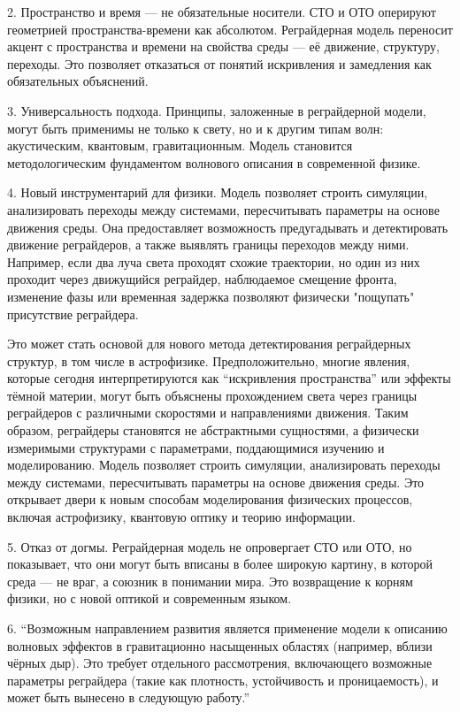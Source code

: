 \documentclass[12pt]{article}
\begin{document}
2. Пространство и время — не обязательные носители.
СТО и ОТО оперируют геометрией пространства-времени как абсолютом. Реграйдерная модель переносит акцент с пространства и времени на свойства среды — её движение, структуру, переходы. Это позволяет отказаться от понятий искривления и замедления как обязательных объяснений.

3. Универсальность подхода.
Принципы, заложенные в реграйдерной модели, могут быть применимы не только к свету, но и к другим типам волн: акустическим, квантовым, гравитационным. Модель становится методологическим фундаментом волнового описания в современной физике.

4. Новый инструментарий для физики.
Модель позволяет строить симуляции, анализировать переходы между системами, пересчитывать параметры на основе движения среды. Она предоставляет возможность предугадывать и детектировать движение реграйдеров, а также выявлять границы переходов между ними. Например, если два луча света проходят схожие траектории, но один из них проходит через движущийся реграйдер, наблюдаемое смещение фронта, изменение фазы или временная задержка позволяют физически "пощупать" присутствие реграйдера.

Это может стать основой для нового метода детектирования реграйдерных структур, в том числе в астрофизике. Предположительно, многие явления, которые сегодня интерпретируются как “искривления пространства” или эффекты тёмной материи, могут быть объяснены прохождением света через границы реграйдеров с различными скоростями и направлениями движения. Таким образом, реграйдеры становятся не абстрактными сущностями, а физически измеримыми структурами с параметрами, поддающимися изучению и моделированию.
Модель позволяет строить симуляции, анализировать переходы между системами, пересчитывать параметры на основе движения среды. Это открывает двери к новым способам моделирования физических процессов, включая астрофизику, квантовую оптику и теорию информации.

5. Отказ от догмы.
Реграйдерная модель не опровергает СТО или ОТО, но показывает, что они могут быть вписаны в более широкую картину, в которой среда — не враг, а союзник в понимании мира. Это возвращение к корням физики, но с новой оптикой и современным языком.

6. “Возможным направлением развития является применение модели к описанию волновых эффектов в гравитационно насыщенных областях (например, вблизи чёрных дыр). Это требует отдельного рассмотрения, включающего возможные параметры реграйдера (такие как плотность, устойчивость и проницаемость), и может быть вынесено в следующую работу.”
\end{document}
